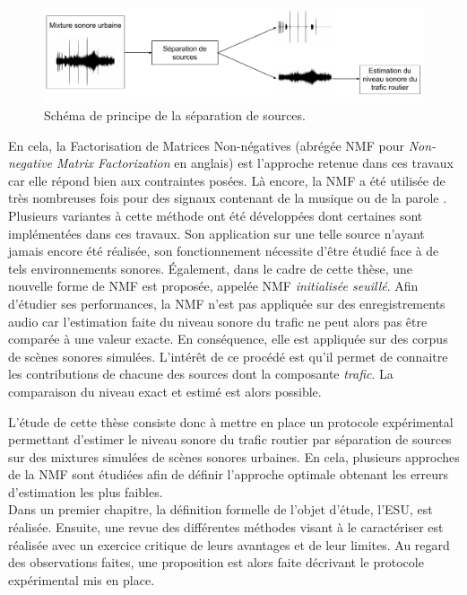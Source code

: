 \begin{figure}[h]
\centering
\includegraphics[width=\linewidth]{./figures/autres/schema_source_separation_FR.pdf}
\caption{Schéma de principe de la séparation de sources.}
\label{fig:separation_source_intro}
\end{figure}


En cela, la Factorisation de Matrices Non-négatives (abrégée NMF pour \textit{Non-negative Matrix Factorization} en anglais) \cite{lee_learning_1999} est l'approche retenue dans ces travaux car elle répond bien aux contraintes posées. Là encore, la NMF a été utilisée de très nombreuses fois pour des signaux contenant de la musique \cite{helen2005separation,fevotte_nonnegative_2009} ou de la parole \cite{wilson2008speech,schmidt2006single}. Plusieurs variantes à cette méthode ont été développées dont certaines sont implémentées dans ces travaux. Son application sur une telle source n'ayant jamais encore été réalisée, son fonctionnement nécessite d'être étudié face à de tels environnements sonores. Également, dans le cadre de cette thèse, une nouvelle forme de NMF est proposée, appelée NMF \textit{initialisée seuillé}. 
Afin d'étudier ses performances, la NMF n'est pas appliquée sur des enregistrements audio car l'estimation faite du niveau sonore du trafic ne peut alors pas être comparée à une valeur exacte. En conséquence, elle est appliquée sur des corpus de scènes sonores simulées. L'intérêt de ce procédé est qu'il permet de connaitre les contributions de chacune des sources dont la composante \textit{trafic}. La comparaison du niveau exact et estimé est alors possible.

L'étude de cette thèse consiste donc à mettre en place un protocole expérimental permettant d'estimer le niveau sonore du trafic routier par séparation de sources sur des mixtures simulées de scènes sonores urbaines. En cela, plusieurs approches de la NMF sont étudiées afin de définir l'approche optimale obtenant les erreurs d'estimation les plus faibles.\\


Dans un premier chapitre, la définition formelle de l'objet d'étude, l'ESU, est réalisée. Ensuite, une revue des différentes méthodes visant à le caractériser est réalisée avec un exercice critique de leurs avantages et de leur limites. Au regard des observations faites, une proposition est alors faite décrivant le protocole expérimental mis en place.

